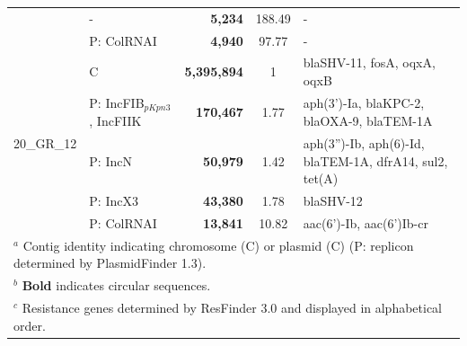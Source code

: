 \begin{landscape}
\begin{table}[!ht]
\begin{tabular}{|l|l|r|c|p{12cm}|}
                            & -                           & \textbf{5,234}        & 188.49   & -                                                                                                                                          \\ \cline{2-5} 
                            & P: ColRNAI                  & \textbf{4,940 }       & 97.77    & -                                                                                                                                          \\ \hline \hline
\multirow{5}{*}{20\_GR\_12} & C                           & \textbf{5,395,894}     & 1        & blaSHV-11, fosA, oqxA, oqxB                                                                                                                \\ \cline{2-5} 
                            & P: IncFIB$_{pKpn3}$, IncFIIK     & \textbf{170,467}      & 1.77     & aph(3')-Ia, blaKPC-2, blaOXA-9, blaTEM-1A                                                                                                  \\ \cline{2-5} 
                            & P: IncN                     & \textbf{50,979}       & 1.42     & aph(3'')-Ib, aph(6)-Id, blaTEM-1A, dfrA14, sul2, tet(A)                                                                                    \\ \cline{2-5} 
                            & P: IncX3                    & \textbf{43,380}       & 1.78     & blaSHV-12                                                                                                                                  \\ \cline{2-5} 
                            & P: ColRNAI                  & \textbf{13,841}       & 10.82    & aac(6')-Ib, aac(6')Ib-cr                                                                                                                   \\ \hline
\multicolumn{5}{l}{{$^a$ Contig identity indicating chromosome (C) or plasmid (C) (P: replicon determined by PlasmidFinder 1.3).}}\\
\multicolumn{5}{l}{{$^b$ \textbf{Bold} indicates circular sequences.}}\\
\multicolumn{5}{l}{{$^c$ Resistance genes determined by ResFinder 3.0 and displayed in alphabetical order.}}
\end{tabular}
\end{table}
\end{landscape}

